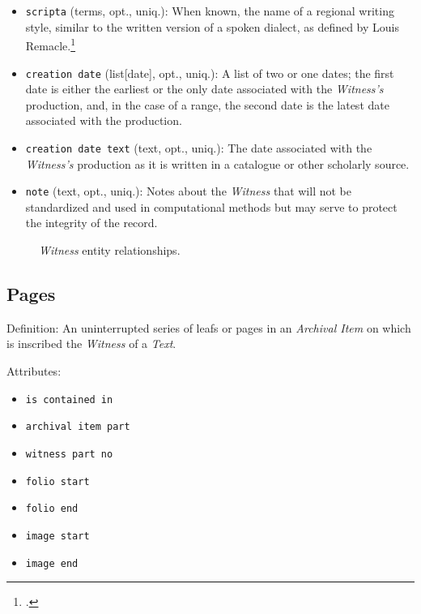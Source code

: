 \begin{itemize}
    \item \texttt{scripta} (terms, opt., uniq.): When known, the name of a regional writing style, similar to the written version of a spoken dialect, as defined by Louis Remacle.\footcite[``Je désigne la langue vulgaire écrite au moyen âge par le néologisme \textit{scripta}. L'expression `la scripta' est synonyme de l'allemand `die Schriftsprache.'''][24]{Remacle1948}
    \item \texttt{creation date} (list[date], opt., uniq.): A list of two or one dates; the first date is either the earliest or the only date associated with the \textit{Witness's} production, and, in the case of a range, the second date is the latest date associated with the production.
    \item \texttt{creation date text} (text, opt., uniq.): The date associated with the \textit{Witness's} production as it is written in a catalogue or other scholarly source.
    \item \texttt{note} (text, opt., uniq.): Notes about the \textit{Witness} that will not be standardized and used in computational methods but may serve to protect the integrity of the record.
\end{itemize}

\begin{figure}[ht]
    \begin{center}
        
    \end{center}
\label{fig:WitnessER}
\caption{\textit{Witness} entity relationships.}
\end{figure}


\subsection{Pages}

Definition: An uninterrupted series of leafs or pages in an \textit{Archival Item} on which is inscribed the \textit{Witness} of a \textit{Text}.

\vspace{1em}
\noindent Attributes:
\begin{itemize}
    \item \texttt{is contained in}
    \item \texttt{archival item part}
    \item \texttt{witness part no}
    \item \texttt{folio start}
    \item \texttt{folio end}
    \item \texttt{image start}
    \item \texttt{image end}
\end{itemize}

